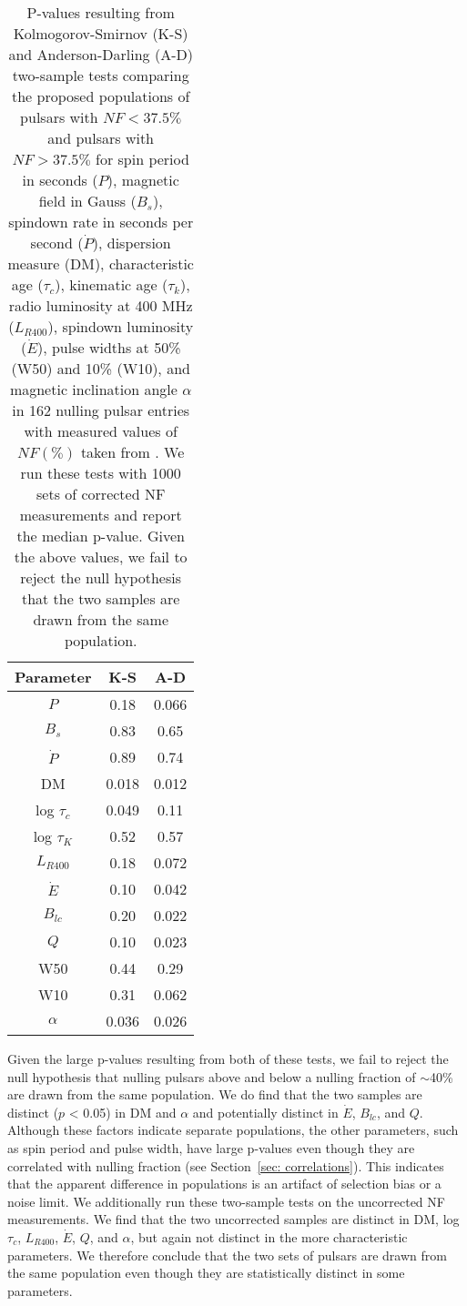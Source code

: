 \documentclass[fleqn,usenatbib]{mnras}
\begin{document}
\begin{table} 
    \centering
    \begin{tabular}{ccc}
    \hline
    \hline
   Parameter & K-S & A-D \\
    \hline
    $P$ & 0.18 & 0.066 \\
    $B_s$ &  0.83 & 0.65 \\
    $\dot{P}$ &  0.89 & 0.74 \\
    DM  & 0.018  & 0.012  \\
    log $\tau_c$  &   0.049 & 0.11 \\
    log $\tau_K$  &  0.52 & 0.57 \\
    $L_{R400}$ &  0.18 & 0.072 \\
    $\dot{E}$ &  0.10 & 0.042 \\
    $B_{lc}$ &   0.20 & 0.022 \\
    $Q$ &  0.10 & 0.023 \\
    W50 &   0.44 &  0.29 \\
    W10 &  0.31  & 0.062 \\
    $\alpha$ &  0.036 &  0.026\\
    \hline
    \end{tabular}
    \caption{P-values resulting from Kolmogorov-Smirnov (K-S) and Anderson-Darling (A-D) two-sample tests comparing the proposed populations of pulsars with $NF<37.5\%$ and pulsars with $NF>37.5\%$ for spin period in seconds ($P$),  magnetic field in Gauss ($B_s$), spindown rate in seconds per second ($\dot{P}$), dispersion measure (DM), characteristic age ($\tau_c$), kinematic age ($\tau_k$), radio luminosity at 400 MHz ($L_{R400}$), spindown luminosity ($\dot{E}$), pulse widths at 50\% (W50) and 10\% (W10), and magnetic inclination angle $\alpha$ in 162 nulling pulsar entries with measured values of $NF (\%)$ taken from \citet{Konar2019}. We run these tests with 1000 sets of corrected NF measurements and report the median p-value. Given the above values, we fail to reject the null hypothesis that the two samples are drawn from the same population.}
    \label{tab:ks-pval}
\end{table}

Given the large p-values resulting from both of these tests, we fail to reject the null hypothesis that nulling pulsars above and below a nulling fraction of $\sim$40\% are drawn from the same population. We do find that the two samples are distinct ($p$ < 0.05) in DM and $\alpha$ and potentially distinct in $\dot{E}$, $B_{lc}$, and $Q$. Although these factors indicate separate populations, the other parameters, such as spin period and pulse width, have large p-values even though they are correlated with nulling fraction (see Section~\ref{sec: correlations}). This indicates that the apparent difference in populations is an artifact of selection bias or a noise limit. We additionally run these two-sample tests on the uncorrected NF measurements. We find that the two uncorrected samples are distinct in DM,  log $\tau_c$,  $L_{R400}$,  $\dot{E}$, $Q$, and $\alpha$, but again not distinct in the more characteristic parameters. We therefore conclude that the two sets of pulsars are drawn from the same population even though they are statistically distinct in some parameters.
\end{document}

